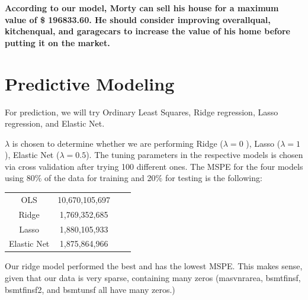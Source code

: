 \documentclass[12pt]{article}
\begin{document}
\begin{flushleft}
\begin{flushleft}
\begin{flushleft}
\begin{flushleft}
\textbf{According to our model, Morty can sell his house for a maximum value of \$ 196833.60. He should consider improving overallqual, kitchenqual, and garagecars to increase the value of his home before putting it on the market.}

\end{flushleft}



\end{flushleft}

\section{Predictive Modeling}

\begin{flushleft}

For prediction, we will try Ordinary Least Squares, Ridge regression, Lasso regression, and Elastic Net. 

\begin{flushleft}

$\lambda$ is chosen to determine whether we are performing Ridge ($\lambda = 0$ ), Lasso ($\lambda = 1$), Elastic Net ($\lambda = 0.5$). The tuning parameters in the respective models is chosen via cross validation after trying 100 different ones. The MSPE for the four models using 80$\%$ of the data for training and 20$\%$ for testing is the following:
\end{flushleft}
\centering
\begin{tabular}{ |c|c|c|c|}
\hline
OLS & 10,670,105,697 \\
Ridge & 1,769,352,685 \\
Lasso & 1,880,105,933 \\
Elastic Net & 1,875,864,966 \\
\hline
\end{tabular}
\begin{flushleft}

Our ridge model performed the best and has the lowest MSPE. This makes sense, given that our data is very sparse, containing many zeros (masvnrarea, bsmtfinsf, bsmtfinsf2, and bsmtunsf all have many zeros.)


\end{flushleft}
\end{flushleft}
\end{flushleft}
\end{flushleft}
\end{document}
